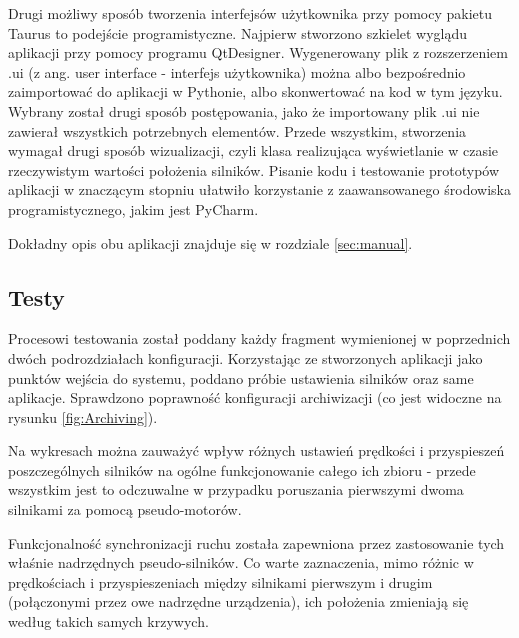 Drugi możliwy sposób tworzenia interfejsów użytkownika przy pomocy pakietu Taurus to podejście programistyczne. Najpierw stworzono szkielet wyglądu aplikacji przy pomocy programu QtDesigner. Wygenerowany plik z rozszerzeniem .ui (z ang. user interface - interfejs użytkownika) można albo bezpośrednio zaimportować do aplikacji w Pythonie, albo skonwertować na kod w tym języku. Wybrany został drugi sposób postępowania, jako że importowany plik .ui nie zawierał wszystkich potrzebnych elementów. Przede wszystkim, stworzenia wymagał drugi sposób wizualizacji, czyli klasa realizująca wyświetlanie w czasie rzeczywistym wartości położenia silników. Pisanie kodu i testowanie prototypów aplikacji w znaczącym stopniu ułatwiło korzystanie z zaawansowanego środowiska programistycznego, jakim jest PyCharm.

Dokładny opis obu aplikacji znajduje się w rozdziale \ref{sec:manual}.


\subsection{Testy}
\label{sub:testy}

\quad Procesowi testowania został poddany każdy fragment wymienionej w poprzednich dwóch podrozdziałach konfiguracji. Korzystając ze stworzonych aplikacji jako punktów wejścia do systemu, poddano próbie ustawienia silników oraz same aplikacje. Sprawdzono poprawność konfiguracji archiwizacji (co jest widoczne na rysunku \ref{fig:Archiving}).

Na wykresach można zauważyć wpływ różnych ustawień prędkości i przyspieszeń poszczególnych silników na ogólne funkcjonowanie całego ich zbioru - przede wszystkim jest to odczuwalne w przypadku poruszania pierwszymi dwoma silnikami za pomocą pseudo-motorów.

Funkcjonalność synchronizacji ruchu została zapewniona przez zastosowanie tych właśnie nadrzędnych pseudo-silników. Co warte zaznaczenia, mimo różnic w prędkościach i przyspieszeniach między silnikami pierwszym i drugim (połączonymi przez owe nadrzędne urządzenia), ich położenia zmieniają się według takich samych krzywych.